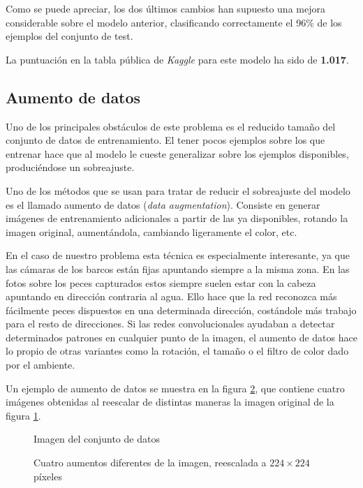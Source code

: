 Como se puede apreciar, los dos últimos cambios han supuesto una mejora considerable sobre el modelo anterior, clasificando correctamente el 96\% de los ejemplos del conjunto de test.

La puntuación en la tabla pública de \textit{Kaggle} para este modelo ha sido
de \textbf{1.017}.


\subsection{Aumento de datos}

Uno de los principales obstáculos de este problema es el reducido tamaño del conjunto de datos de entrenamiento. El tener pocos ejemplos sobre los que entrenar hace que al modelo le cueste generalizar sobre los ejemplos disponibles, produciéndose un sobreajuste.

Uno de los métodos que se usan para tratar de reducir el sobreajuste del modelo es el llamado aumento de datos (\textit{data augmentation}). Consiste en generar imágenes de entrenamiento adicionales a partir de las ya disponibles, rotando la imagen original, aumentándola, cambiando ligeramente el color, etc.

En el caso de nuestro problema esta técnica es especialmente interesante, ya
que las cámaras de los barcos están fijas apuntando siempre a la misma zona. En
las fotos sobre los peces capturados estos siempre suelen estar con la cabeza
apuntando en dirección contraria al agua. Ello hace que la red reconozca más
fácilmente peces dispuestos en una determinada dirección, costándole más
trabajo para el resto de direcciones. Si las redes convolucionales ayudaban a
detectar determinados patrones en cualquier punto de la imagen, el aumento de
datos hace lo propio de otras variantes como la rotación, el tamaño o el filtro
de color dado por el ambiente.

Un ejemplo de aumento de datos se muestra en la figura \ref{augmentations}, que contiene cuatro imágenes obtenidas al reescalar de distintas maneras la imagen original de la figura \ref{aug-original}.

\begin{figure}
    \caption{Imagen del conjunto de datos}
\label{aug-original}
\end{figure}

\begin{figure}
    \caption{Cuatro aumentos diferentes de la imagen, reescalada a $224\times224$ píxeles}
\label{augmentations}
  \makebox[\textwidth]{\texttt{[image: au1]}}
  \makebox[\textwidth]{\texttt{[image: au3]}}
  \makebox[\textwidth]{\texttt{[image: au2]}}
  \makebox[\textwidth]{\texttt{[image: au4]}}
\end{figure}

